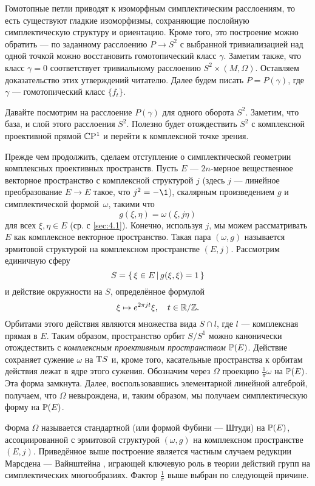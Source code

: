 Гомотопные петли приводят к изоморфным симплектическим расслоениям, то
есть существуют гладкие изоморфизмы, сохраняющие послойную
симплектическую структуру и ориентацию.
Кроме того, это построение можно обратить — по заданному расслоению
$P \to S^2$ с выбранной тривиализацией над одной точкой можно
восстановить гомотопический класс $\gamma$.
Заметим также, что класс $\gamma = 0$ соответствует тривиальному
расслоению $S^2 \times (M, \Omega)$.
Оставляем доказательство этих утверждений читателю.
Далее будем писать $P = P(\gamma)$, где $\gamma$ — гомотопический класс
$\{f_t\}$.

Давайте посмотрим на расслоение $P(\gamma)$ для одного оборота $S^2$.
Заметим, что база, и слой этого расслоения $S^2$.
Полезно будет отождествить $S^2$ с комплексной проективной прямой
$\mathbb{C}\mathrm{P}^1$ и перейти к комплексной точке зрения.

Прежде чем продолжить, сделаем отступление о симплектической геометрии
комплексных проективных пространств. 
Пусть $E$ — $2n$-мерное вещественное векторное пространство с
комплексной структурой $j$ 
(здесь $j$ — линейное преобразование $E\to E$ такое, что $j^2 = -\1$),
скалярным произведением $g$ и симплектической формой~$\omega$, такими что
\[g(\xi, \eta ) = \omega(\xi, j\eta)\]
для всех $\xi, \eta \in E$ (ср. с \ref{sec:4.1}).
Конечно, используя $j$, мы можем рассматривать $E$ как комплексное
векторное пространство. 
Такая пара $(\omega, g)$ называется эрмитовой структурой на
комплексном пространстве $(E, j)$.
Рассмотрим единичную сферу
\[S = \left\{ \,{\xi \in E}\, \middle| \,{g(\xi, \xi) = 1}\, \right\}\]
и действие окружности на $S$, определённое формулой 
\[\xi \mapsto e^{2\pi jt} \xi,\quad t \in \mathbb{R}/\mathbb{Z}.\]
Орбитами этого действия являются множества вида $S \cap l$, где $l$ — комплексная прямая в $E$. 
Таким образом, пространство орбит $S/S^1$ можно канонически отождествить с \emph{комплексным проективным пространством} $\mathbb{P}(E)$.
Действие сохраняет сужение $\omega$ на $\mathrm{T} S$ и, кроме того, касательные пространства к орбитам действия лежат в ядре этого сужения.
Обозначим через $\Omega$ проекцию $\tfrac1\pi \omega$ на $\mathbb{P}(E)$.
Эта форма замкнута.
Далее, воспользовавшись элементарной линейной алгеброй, получаем, что $\Omega$ невырождена, и, таким образом, мы получаем симплектическую форму на $\mathbb{P}(E)$. 

Форма $\Omega$ называется стандартной (или формой Фубини — Штуди) на $\mathbb{P}(E)$, ассоциированной с эрмитовой структурой $(\omega, g)$ на комплексном пространстве $(E, j)$.
Приведённое выше построение является частным случаем редукции Марсдена — Вайнштейна \cite{MS}, играющей ключевую роль в теории действий
групп на симплектических многообразиях.
Фактор $\tfrac1\pi$ выше выбран по следующей причине.


